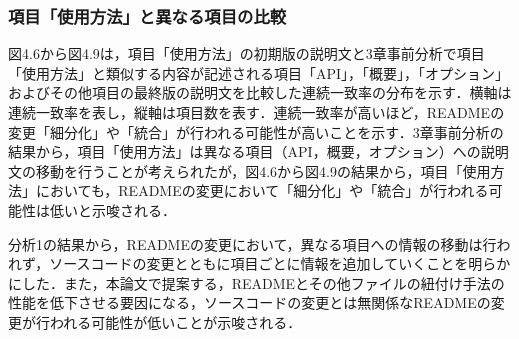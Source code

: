 \documentclass[submit]{ipsj}
\begin{document}
\subsubsection{項目「使用方法」と異なる項目の比較}
図4.6から図4.9は，項目「使用方法」の初期版の説明文と3章事前分析で項目「使用方法」と類似する内容が記述される項目「API」，「概要」，「オプション」およびその他項目の最終版の説明文を比較した連続一致率の分布を示す．横軸は連続一致率を表し，縦軸は項目数を表す．連続一致率が高いほど，READMEの変更「細分化」や「統合」が行われる可能性が高いことを示す．3章事前分析の結果から，項目「使用方法」は異なる項目（API，概要，オプション）への説明文の移動を行うことが考えられたが，図4.6から図4.9の結果から，項目「使用方法」においても，READMEの変更において「細分化」や「統合」が行われる可能性は低いと示唆される．

分析1の結果から，READMEの変更において，異なる項目への情報の移動は行われず，ソースコードの変更とともに項目ごとに情報を追加していくことを明らかにした．また，本論文で提案する，READMEとその他ファイルの紐付け手法の性能を低下させる要因になる，ソースコードの変更とは無関係なREADMEの変更が行われる可能性が低いことが示唆される．


\end{document}
